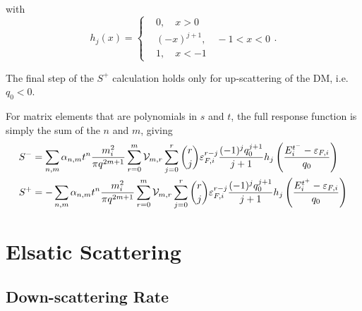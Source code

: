 with 
\begin{equation}
    h_j(x) = \begin{cases}
        & 0, \quad x >0\\
        & (-x)^{j+1},\quad -1<x <0\\
        & 1,\quad x<-1
    \end{cases}.
\end{equation}

The final step of the $S^+$ calculation holds only for up-scattering of the DM, i.e. $q_0<0$.

For matrix elements that are polynomials in $s$ and $t$, the full response function is simply the sum of the $n$ and $m$, giving
\begin{align}
    S^- & = \sum_{n,m}\alpha_{n,m} t^n \frac{m_i^2}{\pi q^{2m + 1}}\sum_{r=0}^m \mathcal{V}_{m,r} \sum_{j = 0}^r \binom{r}{j} \varepsilon_{F,i}^{r-j}  \frac{(-1)^{j} q_0^{j+1}}{j+1} h_j\left( \frac{E_i^{t^-} - \varepsilon_{F,i}}{q_0}\right)\\
    S^+ & = -\sum_{n,m}\alpha_{n,m} t^n \frac{m_i^2}{\pi q^{2m + 1}}\sum_{r=0}^m \mathcal{V}_{m,r} \sum_{j = 0}^r \binom{r}{j} \varepsilon_{F,i}^{r-j}  \frac{(-1)^{j} q_0^{j+1}}{j+1} h_j\left( \frac{E_i^{t^+} - \varepsilon_{F,i}}{q_0}\right)
\end{align}

\section{Elsatic Scattering}
\label{sec:elastic_scatter_full}

\subsection{Down-scattering Rate}
\label{subsec:down_scatter_derivation}


